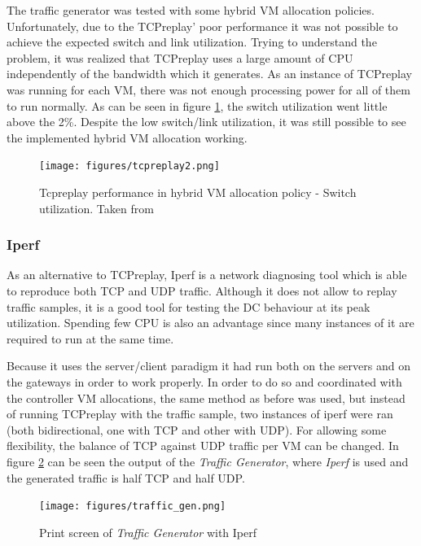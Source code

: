 \documentclass[12pt,english,oneside]{book}
\begin{document}
The traffic generator was tested with some hybrid VM allocation policies.
Unfortunately, due to the TCPreplay' poor performance it was not possible to achieve the expected switch and link utilization.
Trying to understand the problem, it was realized that TCPreplay uses a large amount of CPU independently of the bandwidth which it generates. As an instance of TCPreplay was running for each VM, there was not enough processing power for all of them to run normally.
As can be seen in figure \ref{fig:tcpreplay}, the switch utilization went little above the 2\%.
Despite the low switch/link utilization, it was still possible to see the implemented hybrid VM allocation working.

\begin{figure}[h!tbp]
        \centering
        \texttt{[image: figures/tcpreplay2.png]}
        \caption{Tcpreplay performance in hybrid VM allocation policy - Switch utilization. Taken from \cite{im2013}}
        \label{fig:tcpreplay}
\end{figure}

\subsubsection{Iperf}
\hspace{0.6cm}

As an alternative to TCPreplay, Iperf\cite{iperf} is a network diagnosing tool which is able to reproduce both TCP and UDP traffic.
Although it does not allow to replay traffic samples, it is a good tool for testing the DC behaviour at its peak utilization.
Spending few CPU is also an advantage since many instances of it are required to run at the same time.

Because it uses the server/client paradigm it had run both on the servers and on the gateways in order to work properly. In order to do so and coordinated with the controller VM allocations, the same method as before was used, but instead of running TCPreplay with the traffic sample, two instances of iperf were ran (both bidirectional, one with TCP and other with UDP). For allowing some flexibility, the balance of TCP against UDP traffic per VM can be changed. In figure \ref{fig:trafficgen} can be seen the output of the \textit{Traffic Generator}, where \textit{Iperf} is used and the generated traffic is half TCP and half UDP.

\begin{figure}[h!tbp]
        \centering
        \texttt{[image: figures/traffic\_gen.png]}
        \caption{Print screen of \textit{Traffic Generator} with Iperf}
        \label{fig:trafficgen}
\end{figure}
\end{document}
